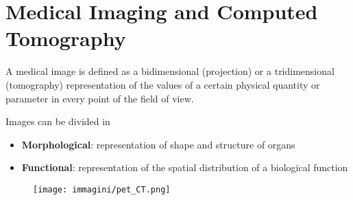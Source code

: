 \chapter{Medical Imaging and Computed Tomography}

A medical image is defined as a bidimensional (projection) or a tridimensional (tomography) representation of the values of a certain physical quantity or parameter in every point of the field of view. 

Images can be divided in 
\begin{itemize}
    \item \textbf{Morphological}: representation of shape and structure of organs 
    \item \textbf{Functional}: representation of the spatial distribution of a biological function 
\end{itemize}


\begin{figure}[h]
    \centering
    \texttt{[image: immagini/pet\_CT.png]} 
    \caption{} 
    \label{fig:pet_CT} 
\end{figure}





